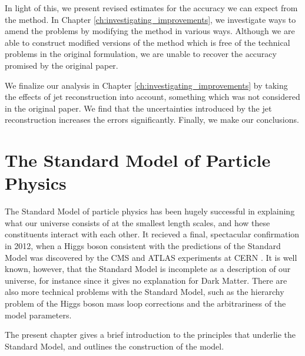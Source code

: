 \documentclass[twoside,english]{uiofysmaster}
\begin{document}
In light of this, we present revised estimates for the accuracy we can expect from the method. In Chapter \ref{ch:investigating_improvements}, we investigate ways to amend the problems by modifying the method in various ways. Although we are able to construct modified versions of the method which is free of the technical problems in the original formulation, we are unable to recover the accuracy promised by the original paper.

We finalize our analysis in Chapter \ref{ch:investigating_improvements} by taking the effects of jet reconstruction into account, something which was not considered in the original paper. We find that the uncertainties introduced by the jet reconstruction increases the errors significantly. Finally, we make our conclusions.


% 
\chapter{The Standard Model of Particle Physics}%
\label{ch:SM_intro}
The Standard Model of particle physics has been hugely successful in explaining what our universe consists of at the smallest length scales, and how these constituents interact with each other. It recieved a final, spectacular confirmation in 2012, when a Higgs boson consistent with the predictions of the Standard Model was discovered by the CMS and ATLAS experiments at CERN \cite{Aad:2012tfa, Chatrchyan:2012ufa}. It is well known, however, that the Standard Model is incomplete as a description of our universe, for instance since it gives no explanation for Dark Matter. There are also more technical problems with the Standard Model, such as the hierarchy problem of the Higgs boson mass loop corrections and the arbitrariness of the model parameters.

The present chapter gives a brief introduction to the principles that underlie the Standard Model, and outlines the construction of the model. 
\end{document}
